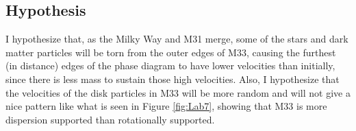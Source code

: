 \documentclass[trackchanges]{aastex7}
\begin{document}
\subsection{Hypothesis}

I hypothesize that, as the Milky Way and M31 merge, some of the stars and dark matter particles will be torn from the outer edges of M33, causing the furthest (in distance) edges of the phase diagram to have lower velocities than initially, since there is less mass to sustain those high velocities. Also, I hypothesize that the velocities of the disk particles in M33 will be more random and will not give a nice pattern like what is seen in Figure \ref{fig:Lab7}, showing that M33 is more dispersion supported than rotationally supported.


{}

\end{document}

